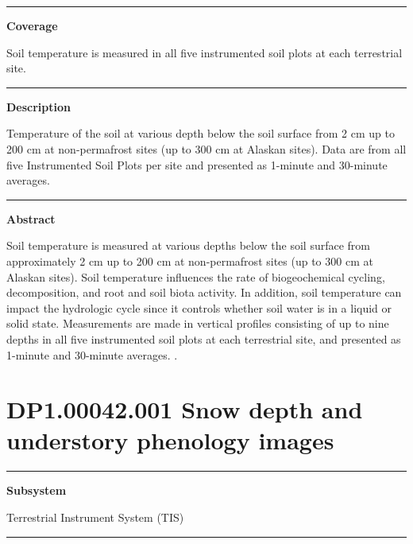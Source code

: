 \documentclass[]{article}
\begin{document}
\begin{center}\rule{0.5\linewidth}{\linethickness}\end{center}

\textbf{Coverage}

Soil temperature is measured in all five instrumented soil plots at each
terrestrial site.

\begin{center}\rule{0.5\linewidth}{\linethickness}\end{center}

\textbf{Description}

Temperature of the soil at various depth below the soil surface from 2
cm up to 200 cm at non-permafrost sites (up to 300 cm at Alaskan sites).
Data are from all five Instrumented Soil Plots per site and presented as
1-minute and 30-minute averages.

\begin{center}\rule{0.5\linewidth}{\linethickness}\end{center}

\textbf{Abstract}

Soil temperature is measured at various depths below the soil surface
from approximately 2 cm up to 200 cm at non-permafrost sites (up to 300
cm at Alaskan sites). Soil temperature influences the rate of
biogeochemical cycling, decomposition, and root and soil biota activity.
In addition, soil temperature can impact the hydrologic cycle since it
controls whether soil water is in a liquid or solid state. Measurements
are made in vertical profiles consisting of up to nine depths in all
five instrumented soil plots at each terrestrial site, and presented as
1-minute and 30-minute averages. \newpage
.

\section{DP1.00042.001 Snow depth and understory phenology
images}\label{dp1.00042.001-snow-depth-and-understory-phenology-images}

\begin{center}\rule{0.5\linewidth}{\linethickness}\end{center}

\textbf{Subsystem}

Terrestrial Instrument System (TIS)

\begin{center}\rule{0.5\linewidth}{\linethickness}\end{center}
\end{document}
